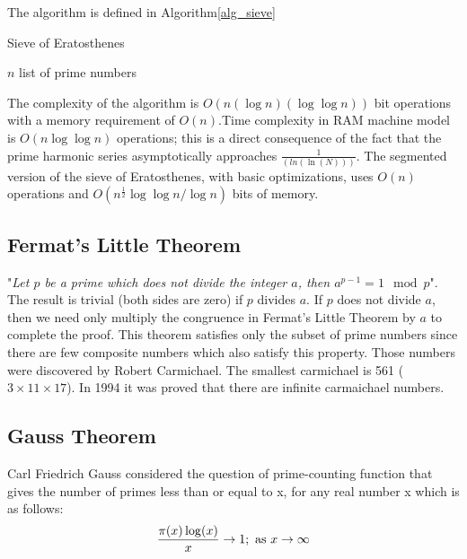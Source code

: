 \documentclass[12pt,journal,compsoc]{IEEEtran}
\begin{document}
The algorithm\cite{eratos} is defined in Algorithm\ref{alg_sieve}

\begin{algorithm}
\caption{Sieve of Eratosthenes}
\label{alg_sieve}
\begin{algorithmic}
	\REQUIRE $n$
	\ENSURE list of prime numbers
	
	\ENDFOR
	
	
		\ENDWHILE
		\REPEAT
	\ENDWHILE
\end{algorithmic}
\end{algorithm}

The complexity of the algorithm is $O(n(\log n)(\log \log n))$\cite{sieve_complexity} bit operations with a memory requirement of $O(n)$.Time complexity in RAM machine model is $O(n\log \log n)$ operations; this is a direct consequence of the fact that the prime harmonic series asymptotically approaches $\frac{1}{(ln(\ln(N)))}$. The segmented version of the sieve of Eratosthenes, with basic optimizations, uses $O(n)$ operations and $O(n^{\frac{1}{2}}\log \log n / \log n)$ bits of memory.

\subsection{{Fermat's Little Theorem\cite{fermat}}}
"\emph{Let $p$ be a prime which does not divide the integer $a$, then $a^{p-1} = 1 \mod p$}"\cite{fermat}. The result is trivial (both sides are zero) if $p$ divides $a$. If $p$ does not divide $a$, then we need only multiply the congruence in Fermat's Little Theorem by $a$ to complete the proof. This theorem satisfies only the subset of prime numbers since there are few composite numbers which also satisfy this property. Those numbers were discovered by Robert Carmichael. The smallest carmichael is 561 ($3 \times 11 \times 17$). In 1994 it was proved that there are infinite carmaichael numbers.

\subsection{{Gauss Theorem}}
Carl Friedrich Gauss considered the question of prime-counting function that gives the number of primes less than or equal to x, for any real number x which is as follows:
	\begin{equation}
	\label{eq:gauss1}
		\frac{\pi(x) \log(x)}{x} \rightarrow 1; \text{ as } x \rightarrow \infty \\
	\end{equation}
\end{document}
